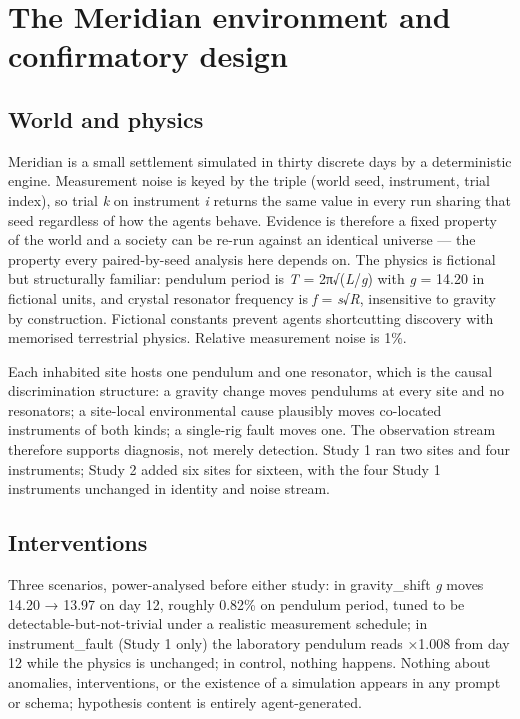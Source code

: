 \documentclass[pdflatex,sn-basic]{sn-jnl}
\begin{document}
\hypertarget{the-meridian-environment-and-confirmatory-design}{%
\section{The Meridian environment and confirmatory design}\label{the-meridian-environment-and-confirmatory-design}}

\hypertarget{world-and-physics}{%
\subsection{World and physics}\label{world-and-physics}}

Meridian is a small settlement simulated in thirty discrete days by
a deterministic engine. Measurement noise is keyed by the triple (world seed, instrument,
trial index), so trial \emph{k} on instrument \emph{i} returns the same value in every run sharing
that seed regardless of how the agents behave. Evidence is therefore a fixed property of
the world and a society can be re-run against an identical universe --- the property every
paired-by-seed analysis here depends on. The physics is fictional but structurally
familiar: pendulum period is \emph{T} = 2π√(\emph{L}/\emph{g}) with \emph{g} = 14.20 in fictional units, and
crystal resonator frequency is \emph{f} = \emph{s}√\emph{R}, insensitive to gravity by construction.
Fictional constants prevent agents shortcutting discovery with memorised terrestrial
physics. Relative measurement noise is 1\%.

Each inhabited site hosts one pendulum and one resonator, which is the causal
discrimination structure: a gravity change moves pendulums at every site and no
resonators; a site-local environmental cause plausibly moves co-located instruments of
both kinds; a single-rig fault moves one. The observation stream therefore supports
diagnosis, not merely detection. Study 1 ran two sites and four instruments; Study 2 added
six sites for sixteen, with the four Study 1 instruments unchanged in identity and noise
stream.

\hypertarget{interventions}{%
\subsection{Interventions}\label{interventions}}

Three scenarios, power-analysed before either study: in gravity\_shift
\emph{g} moves 14.20 → 13.97 on day 12, roughly 0.82\% on pendulum period, tuned to be
detectable-but-not-trivial under a realistic measurement schedule; in instrument\_fault
(Study 1 only) the laboratory pendulum reads ×1.008 from day 12 while the physics is
unchanged; in control, nothing happens. Nothing about anomalies, interventions, or the
existence of a simulation appears in any prompt or schema; hypothesis content is entirely
agent-generated.
\end{document}

